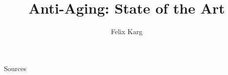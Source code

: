 \usepackage[ngerman, english]{babel}


\title{Anti-Aging: State of the Art}
\author{Felix Karg}


\graphicspath{ {./img/} {../template/} {../template_tex/} } %

\newif\iftwocols
\twocolsfalse





\newif\ifonline
\onlinefalse

% 
% 

% 
% 
% 
% 







\begin{frame}{Sources}

% 

\end{frame}

% 


